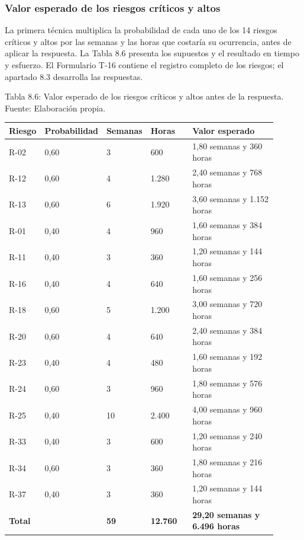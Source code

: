 \documentclass[11pt]{article}
\begin{document}
\subsubsection{Valor esperado de los riesgos críticos y altos}

La primera técnica multiplica la probabilidad de cada uno de los 14 riesgos críticos y altos por las semanas y las horas que costaría su ocurrencia, antes de aplicar la respuesta. La Tabla 8.6 presenta los supuestos y el resultado en tiempo y esfuerzo. El Formulario T-16 contiene el registro completo de los riesgos; el apartado 8.3 desarrolla las respuestas.

Tabla 8.6: Valor esperado de los riesgos críticos y altos antes de la respuesta. Fuente: Elaboración propia.\label{tab:8-6}

\begin{longtable}{p{0.12\linewidth}p{0.12\linewidth}p{0.16\linewidth}p{0.16\linewidth}p{0.34\linewidth}}
\toprule
\textbf{Riesgo} & \textbf{Probabilidad} & \textbf{Semanas} & \textbf{Horas} & \textbf{Valor esperado} \\
\midrule
\endhead
\bottomrule
\endlastfoot
R-02 & 0,60 & 3 & 600 & 1,80 semanas y 360 horas \\
R-12 & 0,60 & 4 & 1.280 & 2,40 semanas y 768 horas \\
R-13 & 0,60 & 6 & 1.920 & 3,60 semanas y 1.152 horas \\
R-01 & 0,40 & 4 & 960 & 1,60 semanas y 384 horas \\
R-11 & 0,40 & 3 & 360 & 1,20 semanas y 144 horas \\
R-16 & 0,40 & 4 & 640 & 1,60 semanas y 256 horas \\
R-18 & 0,60 & 5 & 1.200 & 3,00 semanas y 720 horas \\
R-20 & 0,60 & 4 & 640 & 2,40 semanas y 384 horas \\
R-23 & 0,40 & 4 & 480 & 1,60 semanas y 192 horas \\
R-24 & 0,60 & 3 & 960 & 1,80 semanas y 576 horas \\
R-25 & 0,40 & 10 & 2.400 & 4,00 semanas y 960 horas \\
R-33 & 0,40 & 3 & 600 & 1,20 semanas y 240 horas \\
R-34 & 0,60 & 3 & 360 & 1,80 semanas y 216 horas \\
R-37 & 0,40 & 3 & 360 & 1,20 semanas y 144 horas \\
\textbf{Total} & & \textbf{59} & \textbf{12.760} & \textbf{29,20 semanas y 6.496 horas} \\
\end{longtable}
\end{document}
